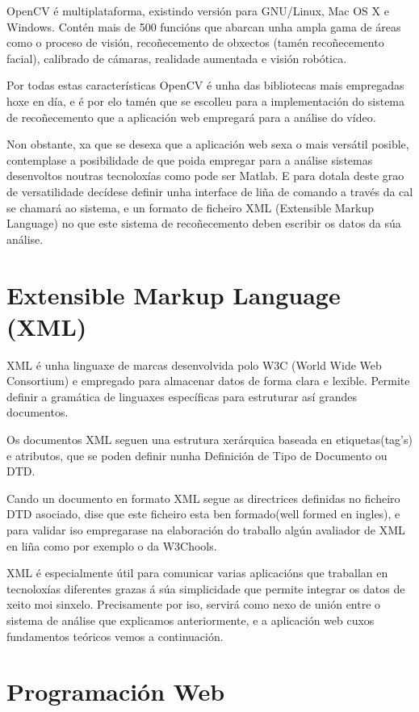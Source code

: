 		OpenCV é multiplataforma, existindo versión para GNU/Linux, Mac OS X e Windows. Contén mais 
		de 500 funcións que abarcan unha ampla gama de áreas como o proceso de visión, recoñecemento
		de obxectos (tamén recoñecemento facial), calibrado de cámaras, realidade aumentada e visión
		robótica.
		
		Por todas estas características OpenCV é unha das bibliotecas mais empregadas hoxe en día, e é
		por elo tamén que se escolleu para a implementación do sistema de recoñecemento que a aplicación
		web empregará para a análise do vídeo.
		
		Non obstante, xa que se desexa que a aplicación web sexa o mais versátil posible, contemplase a
		posibilidade de que poida empregar para a análise sistemas desenvoltos noutras tecnoloxías como
		pode ser Matlab. E para dotala deste grao de versatilidade decídese definir unha interface de
		liña de comando a través da cal se chamará ao sistema, e un formato de ficheiro XML (Extensible 
		Markup Language) no que este sistema de recoñecemento deben escribir os datos da súa análise.
		
\section{Extensible Markup Language (XML)}
	XML é unha linguaxe de marcas desenvolvida polo W3C (World Wide Web Consortium) e empregado
	para almacenar datos de forma clara e lexible. Permite definir a gramática de linguaxes 
	específicas para estruturar así grandes documentos.
	
	Os documentos XML seguen una estrutura xerárquica baseada en etiquetas(tag's) e atributos,
	que se poden definir nunha Definición de Tipo de Documento ou DTD. \cite{dtd-web-page}
	
	Cando un documento en formato XML segue as directrices definidas no ficheiro DTD asociado,
	dise que este ficheiro esta ben formado(well formed en ingles), e para validar iso empregarase
	na elaboración do traballo algún avaliador de XML en liña como por exemplo o da W3Chools.\cite{xml-validator}
	
	XML é especialmente útil para comunicar varias aplicacións que traballan en tecnoloxías 
	diferentes grazas á súa simplicidade que permite integrar os datos de xeito moi sinxelo. Precisamente
	por iso, servirá como nexo de unión entre o sistema de análise que explicamos anteriormente, e a 
	aplicación web cuxos fundamentos teóricos vemos a continuación. 
	
\section{Programación Web}

